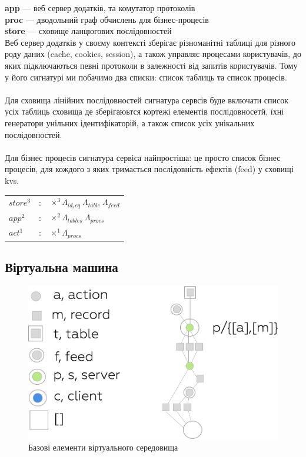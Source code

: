 \documentclass[11pt,oneside]{article}
\begin{document}
{\bf app}    --- веб сервер додатків, та комутатор протоколів\\
{\bf proc}   --- дводольний граф обчислень для бізнес-процесів\\
{\bf store}  --- сховище ланцюгових послідовностей\\

Веб сервер додатків у своєму контексті зберігає різноманітні таблиці для різного
роду даних (cache, cookies, session), а також управляє процесами користувачів,
до яких підключаються певні протоколи в залежності від запитів користувачів.
Тому у його сигнатурі ми побачимо два списки: список таблиць та список процесів.

\paragraph{}
Для сховища лінійних послідовностей сигнатура сервсів буде включати
список усіх таблиць сховища де зберігаюьтся кортежі елементів послідовносетй,
їхні генератори унільних ідентифікаторій, а також список усіх унікальних послідовностей.

\paragraph{}
Для бізнес процесів сигнатура сервіса найпростіша: це просто список бізнес процесів,
для кождого з яких тримається послідовність ефектів (feed) у сховищі kvs.

\begin{center}
\begin{tabular}{lll}
           $store^3$ &:& $\times^3 \Lambda_{id_seq}\ \Lambda_{table}\ \Lambda_{feed}$ \\
             $app^2$ &:& $\times^2 \Lambda_{tables}\ \Lambda_{procs}$ \\
             $act^1$ &:& $\times^1 \Lambda_{procs}$ \\
\end{tabular}
\end{center}

\subsection{Віртуальна машина}

\begin{figure}[h!]
\centering
\includegraphics[scale=0.3]{img/exe-legend}
\caption{Базові елементи віртуального середовища}
\end{figure}
\end{document}
